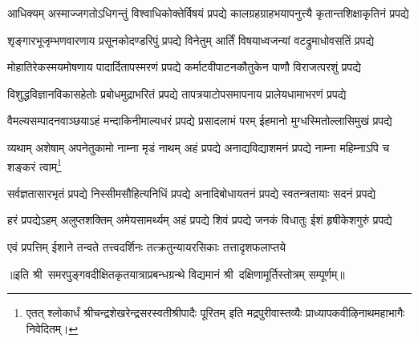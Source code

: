 

\twolineshloka
{आधिक्यम् अस्माज्जगतोऽधिगन्तुं विश्वाधिकोक्तेर्विषयं प्रपद्ये}
{कालग्रहग्राहभयापनुत्त्यै कृतान्तशिक्षाकृतिनं प्रपद्ये}

\twolineshloka
{शृङ्गारभूजृम्भणवारणाय प्रसूनकोदण्डरिपुं प्रपद्ये}
{विनेतुम् आर्तिं विषयाध्वजन्यां वटद्रुमाधोवसतिं प्रपद्ये}

\twolineshloka
{मोहातिरेकस्मयमोषणाय पादार्दितापस्मरणं प्रपद्ये}
{कर्माटवीपाटनकौतुकेन पाणौ विराजत्परशुं प्रपद्ये}

\twolineshloka
{विशुद्धविज्ञानविकासहेतोः प्रबोधमुद्राभरितं प्रपद्ये}
{तापत्रयाटोपसमापनाय प्रालेयधामाभरणं प्रपद्ये}

\twolineshloka
{वैमल्यसम्पादनवाञ्छयाऽहं मन्दाकिनीमाल्यधरं प्रपद्ये}
{प्रसादलाभं परम् ईहमानो मुग्धस्मितोल्लासिमुखं प्रपद्ये}

\twolineshloka
{व्यथाम् अशेषाम् अपनेतुकामो नाम्ना मृडं नाथम् अहं प्रपद्ये}
{अनाद्यविद्याशमनं प्रपद्ये नाम्ना महिम्नाऽपि च शङ्करं त्वाम्}\footnote{एतत् श्लोकार्धं श्रीचन्द्रशेखरेन्द्रसरस्वतीश्रीपादैः पूरितम् इति मद्रपुरीवास्तव्यैः प्राध्यापकवीऴिनाथमहाभागैः निवेदितम्।}

\twolineshloka
{सर्वज्ञतासारभृतं प्रपद्ये निस्सीमसौहित्यनिधिं प्रपद्ये}
{अनादिबोधायतनं प्रपद्ये स्वतन्त्रतायाः सदनं प्रपद्ये}

\twolineshloka
{हरं प्रपद्येऽहम् अलुप्तशक्तिम् अमेयसामर्थ्यम् अहं प्रपद्ये}
{शिवं प्रपद्ये जनकं विधातुः ईशं हृषीकेशगुरुं प्रपद्ये}

\twolineshloka
{एवं प्रपत्तिम् ईशाने तन्वते तत्त्वदर्शिनः}
{तत्क्रतुन्यायरसिकाः तत्तादृशफलाप्तये}


॥इति श्री~समरपुङ्गवदीक्षितकृतयात्राप्रबन्धग्रन्थे विद्यमानं श्री~दक्षिणामूर्तिस्तोत्रम् सम्पूर्णम्॥
